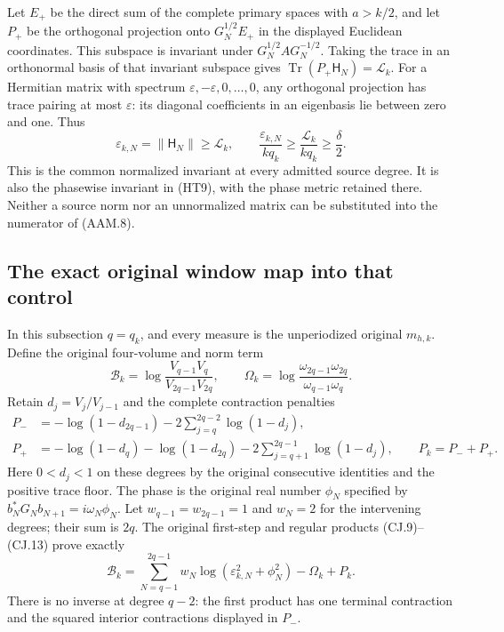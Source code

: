 Let $E_+$ be the direct sum of the complete primary spaces with
$a>k/2$, and let $P_+$ be the orthogonal projection onto
$G_N^{1/2}E_+$ in the displayed Euclidean coordinates.
This subspace is invariant under $G_N^{1/2}AG_N^{-1/2}$.
Taking the trace in an orthonormal basis of that invariant subspace
gives $\operatorname{Tr}(P_+\mathsf H_N)=\mathcal L_k$.
For a Hermitian matrix with spectrum
$\varepsilon,-\varepsilon,0,\ldots,0$, any orthogonal projection
has trace pairing at most $\varepsilon$: its diagonal coefficients
in an eigenbasis lie between zero and one. Thus
\[
 \boxed{\varepsilon_{k,N}=\|\mathsf H_N\|\geq\mathcal L_k,
 \qquad \frac{\varepsilon_{k,N}}{kq_k}\geq
 \frac{\mathcal L_k}{kq_k}\geq\frac\delta2.}
 \tag{AAM.8}
\]
This is the common normalized invariant at every admitted source
degree. It is also the phasewise invariant in (HT9), with the phase
metric retained there. Neither a source norm nor an unnormalized
matrix can be substituted into the numerator of (AAM.8).

\subsection{The exact original window map into that control}

In this subsection $q=q_k$, and every measure is the unperiodized
original $m_{h,k}$. Define the original four-volume and norm term
\[
 \mathcal B_k=\log\frac{V_{q-1}V_q}{V_{2q-1}V_{2q}},\qquad
 \Omega_k=\log\frac{\omega_{2q-1}\omega_{2q}}
                         {\omega_{q-1}\omega_q}.
 \tag{AAM.9}
\]
Retain $d_j=V_j/V_{j-1}$ and the complete contraction penalties
\[
 \begin{aligned}
 P_-&=-\log(1-d_{2q-1})-2\sum_{j=q}^{2q-2}\log(1-d_j),\\
 P_+&=-\log(1-d_q)-\log(1-d_{2q})
                  -2\sum_{j=q+1}^{2q-1}\log(1-d_j),
 \qquad P_k=P_-+P_+.
 \end{aligned}
 \tag{AAM.10}
\]
Here $0<d_j<1$ on these degrees by the original consecutive identities
and the positive trace floor. The phase is the original real number
$\phi_N$ specified by $b_N^*G_Nb_{N+1}=i\omega_N\phi_N$.
Let $w_{q-1}=w_{2q-1}=1$ and $w_N=2$ for the intervening degrees;
their sum is $2q$. The original first-step and regular products
(CJ.9)--(CJ.13) prove exactly
\[
 \mathcal B_k=\sum_{N=q-1}^{2q-1}w_N
                  \log(\varepsilon_{k,N}^2+\phi_N^2)
                         -\Omega_k+P_k.
 \tag{AAM.11}
\]
There is no inverse at degree $q-2$: the first product has one terminal
contraction and the squared interior contractions displayed in $P_-$.

